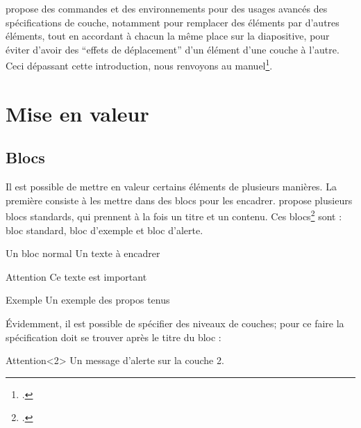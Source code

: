 
 propose des commandes et des environnements pour des usages avancés des spécifications de couche, notamment pour remplacer des éléments par d'autres éléments, tout en accordant à chacun la même place sur la diapositive, pour éviter d'avoir des \enquote{effets de déplacement} d'un élément d'une couche à l'autre. 
Ceci dépassant cette introduction, nous renvoyons au manuel\footcite{beamer_overlays}.
\section{Mise en valeur}

\subsection{Blocs}

Il est possible de mettre en valeur certains éléments de plusieurs manières. La première  consiste à les mettre dans des blocs pour les encadrer.  propose plusieurs blocs standards, qui prennent à la fois un titre et un contenu. Ces blocs\footcites[Il est possible de créer ses propres blocs, voir : ][]{beamer_box}[il existe aussi des éléments proches des blocs que sont les encadrés, pour mettre en valeur des définitions, des théorèmes, voir:][]{beamer_theorems} sont  : bloc standard, bloc d'exemple et bloc d'alerte.

\begin{latexcode}
\begin{block}{Un bloc normal} 
	Un texte à encadrer
\end{block}
\begin{alertblock}{Attention} 
	Ce texte est important
\end{alertblock}
\begin{exampleblock}{Exemple} 
	Un exemple des propos tenus
\end{exampleblock}
\end{latexcode}

Évidemment, il est possible de spécifier des niveaux de couches; pour ce faire la spécification doit se trouver après le titre du bloc :

\begin{latexcode}
\begin{alertblock}{Attention}<2>
	Un message d'alerte sur la couche 2.
\end{alertblock}
\end{latexcode}


